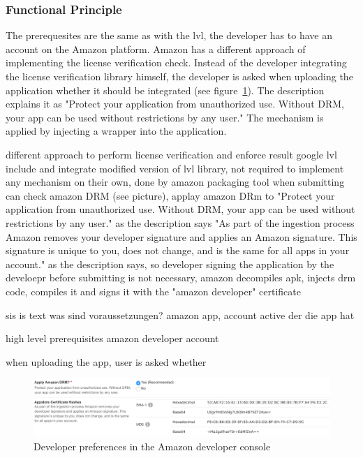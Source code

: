 \subsubsection{Functional Principle} \label{section:license-amazon-functional}
The prerequesites are the same as with the \gls{lvl}, the developer has to have an account on the Amazon platform.
Amazon has a different approach of implementing the license verification check.
Instead of the developer integrating the license verification library himself, the developer is asked when uploading the application whether it should be integrated (see figure~\ref{fig:amazon}).
The description explains it as "Protect your application from unauthorized use. Without DRM, your app can be used without restrictions by any user." \cite{amazonDeveloper}
The mechanism is applied by injecting a wrapper into the application.



different approach to perform license verification and enforce result
google lvl include and integrate modified version of lvl library, not required to implement any mechanism on their own, done by amazon packaging tool
when submitting can check amazon DRM (see picture), applay amazon DRm to "Protect your application from unauthorized use. Without DRM, your app can be used without restrictions by any user." as the description says
"As part of the ingestion process Amazon removes your developer signature and applies an Amazon signature. This signature is unique to you, does not change, and is the same for all apps in your account."  as the description says, so developer signing the application by the develoepr before submitting is not necessary, amazon decompiles apk, injects drm code, compiles it and signs it with the "amazon developer" certificate



sis is text
was sind voraussetzungen? amazon app, account active der die app hat\newline

high level prerequisites
amazon developer account

when uploading the app, user is asked whether
\begin{figure}[h]
    \centering
    \includegraphics[width=1\textwidth]{data/amazon.png}
    \caption{Developer preferences in the Amazon developer console \cite{amazonDeveloper}}
    \label{fig:amazon}
\end{figure}


